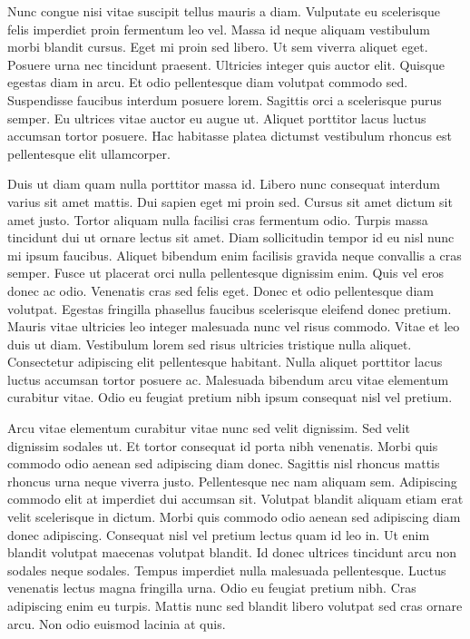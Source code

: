 \documentclass{rust-edu-workshop}
\begin{document}
  Nunc congue nisi vitae suscipit tellus mauris a
  diam. Vulputate eu scelerisque felis imperdiet proin
  fermentum leo vel. Massa id neque aliquam vestibulum morbi
  blandit cursus. Eget mi proin sed libero. Ut sem viverra
  aliquet eget. Posuere urna nec tincidunt
  praesent. Ultricies integer quis auctor elit. Quisque
  egestas diam in arcu. Et odio pellentesque diam volutpat
  commodo sed. Suspendisse faucibus interdum posuere
  lorem. Sagittis orci a scelerisque purus semper. Eu
  ultrices vitae auctor eu augue ut. Aliquet porttitor lacus
  luctus accumsan tortor posuere. Hac habitasse platea
  dictumst vestibulum rhoncus est pellentesque elit
  ullamcorper.

  Duis ut diam quam nulla porttitor massa id. Libero nunc
  consequat interdum varius sit amet mattis. Dui sapien eget
  mi proin sed. Cursus sit amet dictum sit amet
  justo. Tortor aliquam nulla facilisi cras fermentum
  odio. Turpis massa tincidunt dui ut ornare lectus sit
  amet. Diam sollicitudin tempor id eu nisl nunc mi ipsum
  faucibus. Aliquet bibendum enim facilisis gravida neque
  convallis a cras semper. Fusce ut placerat orci nulla
  pellentesque dignissim enim. Quis vel eros donec ac
  odio. Venenatis cras sed felis eget. Donec et odio
  pellentesque diam volutpat. Egestas fringilla phasellus
  faucibus scelerisque eleifend donec pretium. Mauris vitae
  ultricies leo integer malesuada nunc vel risus
  commodo. Vitae et leo duis ut diam. Vestibulum lorem sed
  risus ultricies tristique nulla aliquet. Consectetur
  adipiscing elit pellentesque habitant. Nulla aliquet
  porttitor lacus luctus accumsan tortor posuere
  ac. Malesuada bibendum arcu vitae elementum curabitur
  vitae. Odio eu feugiat pretium nibh ipsum consequat nisl
  vel pretium.

  Arcu vitae elementum curabitur vitae nunc sed velit
  dignissim. Sed velit dignissim sodales ut. Et tortor
  consequat id porta nibh venenatis. Morbi quis commodo odio
  aenean sed adipiscing diam donec. Sagittis nisl rhoncus
  mattis rhoncus urna neque viverra justo. Pellentesque nec
  nam aliquam sem. Adipiscing commodo elit at imperdiet dui
  accumsan sit. Volutpat blandit aliquam etiam erat velit
  scelerisque in dictum. Morbi quis commodo odio aenean sed
  adipiscing diam donec adipiscing. Consequat nisl vel
  pretium lectus quam id leo in. Ut enim blandit volutpat
  maecenas volutpat blandit. Id donec ultrices tincidunt
  arcu non sodales neque sodales. Tempus imperdiet nulla
  malesuada pellentesque. Luctus venenatis lectus magna
  fringilla urna. Odio eu feugiat pretium nibh. Cras
  adipiscing enim eu turpis. Mattis nunc sed blandit libero
  volutpat sed cras ornare arcu. Non odio euismod lacinia at
  quis.
\end{document}
